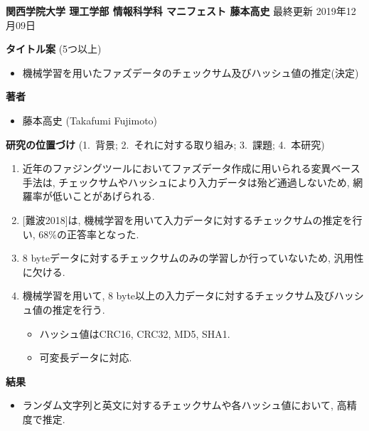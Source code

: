 \documentclass{jarticle}
\begin{document}
\noindent
\textbf{関西学院大学 理工学部 情報科学科  マニフェスト 藤本高史} \hfill 最終更新 2019年12月09日

\bigskip\noindent
\textbf{タイトル案} (5つ以上) %

\begin{itemize}
 \item 機械学習を用いたファズデータのチェックサム及びハッシュ値の推定(決定)
\end{itemize}

\medskip\noindent
\textbf{著者} %
\begin{itemize}
 \item[]
 藤本高史 (Takafumi Fujimoto)
\end{itemize}

\medskip\noindent
\textbf{研究の位置づけ} (1.~背景;  2.~それに対する取り組み; 3.~課題; 4.~本研究)

\begin{enumerate}

 \item 近年のファジングツールにおいてファズデータ作成に用いられる変異ベース手法は,
 チェックサムやハッシュにより入力データは殆ど通過しないため, 網羅率が低いことがあげられる.\par

 \item {[難波2018]}は, 機械学習を用いて入力データに対するチェックサムの推定を行い, 68\%の正答率となった.

 \item 8 byteデータに対するチェックサムのみの学習しか行っていないため, 汎用性に欠ける.

 \item 機械学習を用いて, 8 byte以上の入力データに対するチェックサム及びハッシュ値の推定を行う.
 \begin{itemize}
  \item ハッシュ値はCRC16, CRC32, MD5, SHA1.\par
  \item 可変長データに対応.\par
 \end{itemize}
\end{enumerate}

\textbf{結果}
\begin{itemize}
 \item ランダム文字列と英文に対するチェックサムや各ハッシュ値において, 高精度で推定.\par
\end{itemize}
\end{document}
